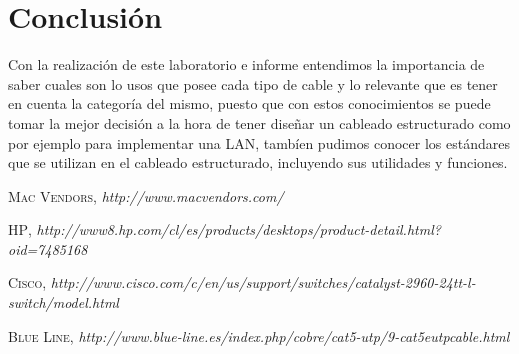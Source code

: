 \documentclass{udpreport}
\begin{document}
\chapter{Conclusión}
    Con la realización de este laboratorio e informe entendimos la importancia de saber cuales son lo usos que posee cada tipo de cable y lo relevante que es tener en cuenta la categoría del mismo, puesto que con estos conocimientos se puede tomar la mejor decisión a la hora de tener diseñar un cableado estructurado como por ejemplo para implementar una LAN, tambíen pudimos conocer los estándares que se utilizan en el cableado estructurado, incluyendo sus utilidades y funciones.
\begin{thebibliography}{x}

 \textsc{Mac Vendors},
\textit{http://www.macvendors.com/}

 \textsc{HP},
\textit{http://www8.hp.com/cl/es/products/desktops/product-detail.html?oid=7485168}

 \textsc{Cisco},
\textit{http://www.cisco.com/c/en/us/support/switches/catalyst-2960-24tt-l-switch/model.html}

 \textsc{Blue Line},
\textit{http://www.blue-line.es/index.php/cobre/cat5-utp/9-cat5eutpcable.html}

\end{thebibliography}
\end{document}
